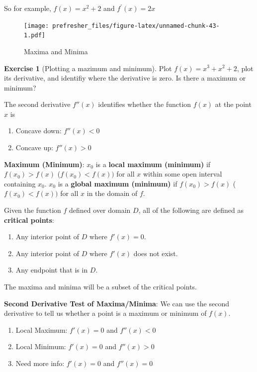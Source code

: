 \documentclass[
]{book}
\providecommand{\tightlist}{%
  \setlength{\itemsep}{0pt}\setlength{\parskip}{0pt}}
\theoremstyle{definition}
\theoremstyle{definition}
\theoremstyle{definition}
\newtheorem{exercise}{Exercise}[chapter]
\theoremstyle{remark}
\begin{document}
So for example, \(f(x) = x^2 + 2\) and \(f^\prime(x) = 2x\)

\begin{figure}
\centering
\texttt{[image: prefresher\_files/figure-latex/unnamed-chunk-43-1.pdf]}
\caption{\label{fig:unnamed-chunk-43}Maxima and Minima}
\end{figure}

\begin{exercise}[Plotting a mazimum and minimum]
\protect\hypertarget{exr:unnamed-chunk-44}{}{\label{exr:unnamed-chunk-44} {} }Plot \(f(x)=x^3+ x^2 + 2\), plot its derivative, and identifiy where the derivative is zero. Is there a maximum or minimum?
\end{exercise}

The second derivative \(f''(x)\) identifies whether the function \(f(x)\) at the point \(x\) is

\begin{enumerate}
\def\labelenumi{\arabic{enumi}.}
\tightlist
\item
  Concave down: \(f''(x)<0\)
\item
  Concave up: \(f''(x)>0\)
\end{enumerate}

\textbf{Maximum (Minimum)}: \(x_0\) is a \textbf{local maximum (minimum)} if \(f(x_0)>f(x)\) (\(f(x_0)<f(x))\) for all \(x\) within some open interval containing \(x_0\). \(x_0\) is a \textbf{global maximum (minimum)} if \(f(x_0)>f(x)\) (\(f(x_0)<f(x))\) for all \(x\) in the domain of \(f\).

Given the function \(f\) defined over domain \(D\), all of the following are defined as \textbf{critical points}:

\begin{enumerate}
\def\labelenumi{\arabic{enumi}.}
\tightlist
\item
  Any interior point of \(D\) where \(f'(x)=0\).
\item
  Any interior point of \(D\) where \(f'(x)\) does not exist.
\item
  Any endpoint that is in \(D\).
\end{enumerate}

The maxima and minima will be a subset of the critical points.

\textbf{Second Derivative Test of Maxima/Minima}: We can use the second derivative to tell us whether a point is a maximum or minimum of \(f(x)\).

\begin{enumerate}
\def\labelenumi{\arabic{enumi}.}
\tightlist
\item
  Local Maximum: \(f'(x)=0\) and \(f''(x)<0\)
\item
  Local Minimum: \(f'(x)=0\) and \(f''(x)>0\)
\item
  Need more info: \(f'(x)=0\) and \(f''(x)=0\)
\end{enumerate}
\end{document}
